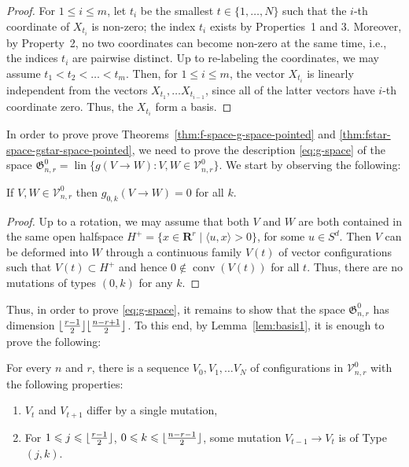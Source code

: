 \documentclass[a4paper,USenglish,cleveref, autoref, thm-restate,nolineno]{socg-lipics-v2021}
\DeclareMathOperator{\conv}{conv}
\DeclareMathOperator{\lin}{lin}
\newcommand{\gspace}{\mathfrak{G}}
\renewcommand{\leq}{\leqslant}
\newcommand{\R}{\mathbf{R}}
\DeclarePairedDelimiter\floor{\lfloor}{\rfloor}
\begin{document}
\begin{proof}
For $1 \leq i\leq m$, let $t_i$ be the smallest $t\in \{1,\dots,N\}$ such that the $i$-th coordinate of $X_{t_i}$ is non-zero; the index $t_i$ exists by Properties~1 and 3. Moreover, by Property~2, no two coordinates can become non-zero at the same time, i.e., the indices $t_i$ are pairwise distinct. Up to re-labeling the coordinates, we may assume $t_1 < t_2 < \ldots < t_m$. Then, for $1\leq i \leq m$, the vector $X_{t_i}$ is linearly independent from the vectors $X_{t_1},\dots X_{t_{i-1}}$, since all of the latter vectors have $i$-th coordinate zero. Thus, the $X_{t_i}$ form a basis.
\end{proof}

In order to prove prove Theorems~\ref{thm:f-space-g-space-pointed} and \ref{thm:fstar-space-gstar-space-pointed}, we need to prove the description \eqref{eq:g-space} of the space $\gspace_{n,r}^0=\lin\{g(V\to W)\colon V,W \in \mathcal{V}^0_{n,r}\}$. We start by observing the following:
\begin{lemma}
If $V,W \in \mathcal{V}^0_{n,r}$ then $g_{0,k}(V \to W)=0$ for all $k$.
\end{lemma}

\begin{proof}
Up to a rotation, we may assume that both $V$ and $W$ are both contained in the same open halfspace $H^+ = \{ x \in \R^r \mid \langle u ,x \rangle > 0 \}$, for some $u \in S^d$. Then $V$ can be deformed into $W$ through a continuous family $V(t)$ of vector configurations such that $V(t) \subset H^+$ and hence $0 \notin \conv (V(t))$ for all $t$. Thus, there are no mutations of types $(0,k)$ for any $k$.
\end{proof}
 
 
Thus, in order to prove \eqref{eq:g-space}, it remains to show that the space $\gspace^0_{n,r}$ has dimension $\floor{\frac{r-1}{2}}\floor{\frac{n-r+1}{2}}$. 
To this end, by Lemma~\ref{lem:basis1}, it is enough to prove the following:
\begin{lemma}
\label{lem:all-mutations}
For every $n$ and $r$, there is a sequence $V_0, V_1, \ldots V_N$ of configurations in $\mathcal{V}^0_{n,r}$ with the following properties:
\begin{enumerate}
\item $V_t$ and $V_{t+1}$ differ by a single mutation,
\item For $1 \leq j \leq \floor{\frac{r-1}{2}}$, $0 \leq k \leq \floor{\frac{n-r-1}{2}}$, some mutation $V_{t-1} \to V_t$ is of Type $(j,k)$.
\end{enumerate}
\end{lemma}
\end{document}
